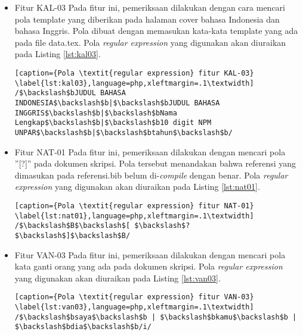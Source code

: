 \begin{itemize}
\begin{lstlisting}[caption={Pola \textit{regular expression} fitur KAL-02}	\label{lst:kal02},language=php,xleftmargin=.1\textwidth]
/ $\hat{}$ (BAB )[0-9]$\lbrace$1$\rbrace$[$\backslash$sA-Z]$\lbrace$ $\rbrace$1,[0-9]+ /	
\end{lstlisting}	
\medskip
	
	\item Fitur KAL-03 \newline
	Pada fitur ini, pemeriksaan dilakukan dengan cara mencari pola template yang diberikan pada halaman cover bahasa Indonesia dan bahasa Inggris. Pola dibuat dengan memasukan kata-kata  template yang ada pada file data.tex. Pola \textit{regular expression} yang digunakan akan diuraikan pada Listing \ref{lst:kal03}.
	
	\begin{lstlisting}[caption={Pola \textit{regular expression} fitur KAL-03}	\label{lst:kal03},language=php,xleftmargin=.1\textwidth]
/$\backslash$bJUDUL BAHASA INDONESIA$\backslash$b|$\backslash$bJUDUL BAHASA INGGRIS$\backslash$b|$\backslash$bNama Lengkap$\backslash$b|$\backslash$b10 digit NPM UNPAR$\backslash$b|$\backslash$btahun$\backslash$b/
\end{lstlisting}	
\medskip

	\item Fitur NAT-01 \newline
	Pada fitur ini, pemeriksaan dilakukan dengan mencari pola ''[?]'' pada dokumen skripsi. Pola tersebut menandakan bahwa referensi yang dimasukan pada referensi.bib belum di-\textit{compile} dengan benar. Pola \textit{regular expression} yang digunakan akan diuraikan pada Listing \ref{lst:nat01}.
	
	\begin{lstlisting}[caption={Pola \textit{regular expression} fitur NAT-01}	\label{lst:nat01},language=php,xleftmargin=.1\textwidth]
/$\backslash$B$\backslash$[ $\backslash$?$\backslash$]$\backslash$B/
\end{lstlisting}	
\medskip

	\item Fitur VAN-03 \newline
	Pada fitur ini, pemeriksaan dilakukan dengan mencari pola kata ganti orang yang ada pada dokumen skripsi. Pola \textit{regular expression} yang digunakan akan diuraikan pada Listing \ref{lst:van03}.
	
	\begin{lstlisting}[caption={Pola \textit{regular expression} fitur VAN-03}	\label{lst:van03},language=php,xleftmargin=.1\textwidth]
/$\backslash$bsaya$\backslash$b | $\backslash$bkamu$\backslash$b | $\backslash$bdia$\backslash$b/i/
\end{lstlisting}	
\end{itemize}

